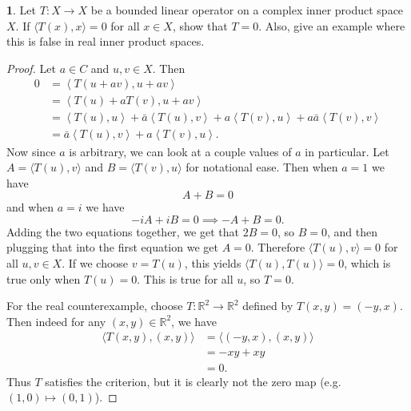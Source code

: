 \documentclass[12pt]{article}
\theoremstyle{definition}
\newtheorem{ex}{}
\begin{document}
\begin{ex}
	Let $T : X \to X$ be a bounded linear operator on a complex inner product space $X$.
	If $\langle T(x), x \rangle = 0$ for all $x \in X$, show that $T = 0$.
	Also, give an example where this is false in real inner product spaces.
\end{ex}
\begin{proof}
	Let $a \in C$ and $u, v \in X$.
	Then \begin{align*}
		0 & = \left\langle T(u + av), u + av \right\rangle                                                                                                                       \\
		  & = \left\langle T(u) + aT(v), u + av \right\rangle                                                                                                                    \\
		  & = \left\langle T(u), u \right\rangle + \bar{a}\left\langle T(u), v \right\rangle + a \left\langle T(v), u \right\rangle + a\bar{a}\left\langle T(v), v \right\rangle \\
		  & = \bar{a}\left\langle T(u), v \right\rangle + a \left\langle T(v), u \right\rangle.
	\end{align*}
	Now since $a$ is arbitrary, we can look at a couple values of $a$ in particular.
	Let $A = \langle T(u), v \rangle$ and $B = \langle T(v), u \rangle$ for notational ease.
	Then when $a = 1$ we have \begin{equation*}
		A + B = 0
	\end{equation*}
	and when $a = i$ we have \begin{equation*}
		-iA + iB = 0 \implies -A + B = 0.
	\end{equation*}
	Adding the two equations together, we get that $2B = 0$, so $B = 0$, and then plugging that into the first equation we get $A = 0$.
	Therefore $\langle T(u), v \rangle = 0$ for all $u, v \in X$.
	If we choose $v = T(u)$, this yields $\langle T(u), T(u) \rangle = 0$, which is true only when $T(u) = 0$.
	This is true for all $u$, so $T = 0$.

	For the real counterexample, choose $T : \mathbb{R}^2 \to \mathbb{R}^2$ defined by $T(x, y) = (-y, x)$.
	Then indeed for any $(x, y) \in \mathbb{R}^2$, we have \begin{align*}
		\langle T(x, y), (x, y) \rangle & = \langle (-y, x), (x, y) \rangle \\
		                                & = -xy + xy                        \\
		                                & = 0.
	\end{align*}
	Thus $T$ satisfies the criterion, but it is clearly not the zero map (e.g. $(1, 0) \mapsto (0, 1)$).
\end{proof}
\end{document}
